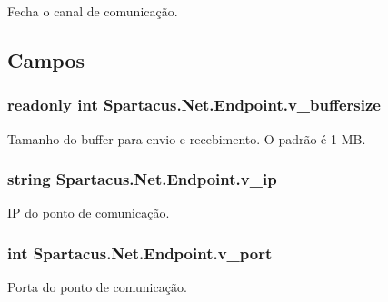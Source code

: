 Fecha o canal de comunicação. 



\subsection{Campos}
\hypertarget{classSpartacus_1_1Net_1_1Endpoint_aeeae98f80d493442d5f50447339d16d9}{
\subsubsection[{v\+\_\+buffersize}]{\setlength{\rightskip}{0pt plus 5cm}readonly int Spartacus.\+Net.\+Endpoint.\+v\+\_\+buffersize}}\label{classSpartacus_1_1Net_1_1Endpoint_aeeae98f80d493442d5f50447339d16d9}


Tamanho do buffer para envio e recebimento. O padrão é 1 M\+B. 

\hypertarget{classSpartacus_1_1Net_1_1Endpoint_a82ff144ce1df33989e110dc16dfd6ec7}{
\subsubsection[{v\+\_\+ip}]{\setlength{\rightskip}{0pt plus 5cm}string Spartacus.\+Net.\+Endpoint.\+v\+\_\+ip}}\label{classSpartacus_1_1Net_1_1Endpoint_a82ff144ce1df33989e110dc16dfd6ec7}


I\+P do ponto de comunicação. 

\hypertarget{classSpartacus_1_1Net_1_1Endpoint_a70e8d6856b79d128208f3175cf00166f}{
\subsubsection[{v\+\_\+port}]{\setlength{\rightskip}{0pt plus 5cm}int Spartacus.\+Net.\+Endpoint.\+v\+\_\+port}}\label{classSpartacus_1_1Net_1_1Endpoint_a70e8d6856b79d128208f3175cf00166f}


Porta do ponto de comunicação. 

